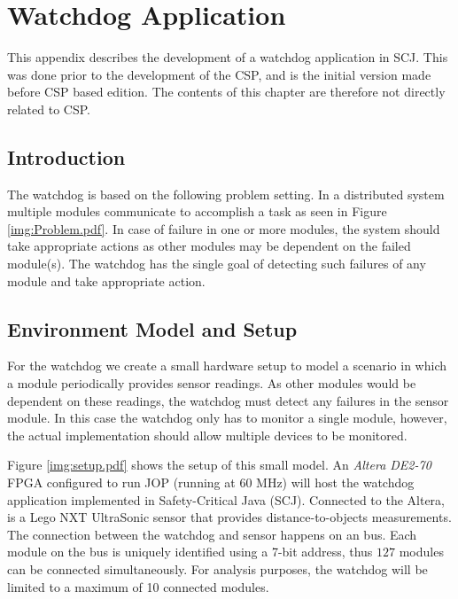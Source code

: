 \chapter{Watchdog Application}
This appendix describes the development of a watchdog application in SCJ. This was done prior to the development of the CSP, and is the initial version made before CSP based edition. The contents of this chapter are therefore not directly related to CSP.


\section{Introduction}
The watchdog is based on the following problem setting. In a distributed system multiple modules communicate to accomplish a task as seen in Figure \ref{img:Problem.pdf}. In case of failure in one or more modules, the system should take appropriate actions as other modules may be dependent on the failed module(s). The watchdog has the single goal of detecting such failures of any module and take appropriate action.


\section{Environment Model and Setup}
For the watchdog we create a small hardware setup to model a scenario in which a module periodically provides sensor readings. As other modules would be dependent on these readings, the watchdog must detect any failures in the sensor module. In this case the watchdog only has to monitor a single module, however, the actual implementation should allow multiple devices to be monitored.

Figure \ref{img:setup.pdf} shows the setup of this small model. An \textit{Altera DE2-70} FPGA configured to run JOP (running at 60 MHz) will host the watchdog application implemented in Safety-Critical Java (SCJ). Connected to the Altera, is a Lego NXT UltraSonic sensor that provides distance-to-objects measurements. The connection between the watchdog and sensor happens on an \iic bus. Each module on the bus is uniquely identified using a 7-bit address, thus $127$ modules can be connected simultaneously. For analysis purposes, the watchdog will be limited to a maximum of 10 connected modules.


